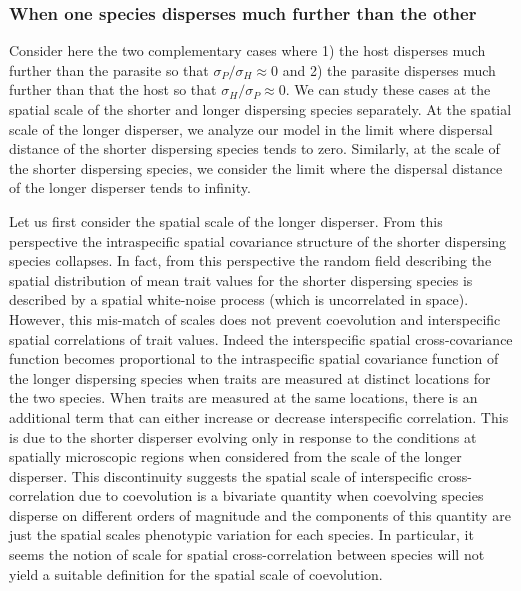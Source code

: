 \documentclass{article}
\begin{document}
\hypertarget{when-one-species-disperses-much-further-than-the-other}{%
\subsubsection{When one species disperses much further than the
other}\label{when-one-species-disperses-much-further-than-the-other}}

Consider here the two complementary cases where 1) the host disperses
much further than the parasite so that \(\sigma_P/\sigma_H\approx0\) and
2) the parasite disperses much further than that the host so that
\(\sigma_H/\sigma_P\approx0\). We can study these cases at the spatial
scale of the shorter and longer dispersing species separately. At the
spatial scale of the longer disperser, we analyze our model in the limit
where dispersal distance of the shorter dispersing species tends to
zero. Similarly, at the scale of the shorter dispersing species, we
consider the limit where the dispersal distance of the longer disperser
tends to infinity.

Let us first consider the spatial scale of the longer disperser. From
this perspective the intraspecific spatial covariance structure of the
shorter dispersing species collapses. In fact, from this perspective the
random field describing the spatial distribution of mean trait values
for the shorter dispersing species is described by a spatial white-noise
process (which is uncorrelated in space). However, this mis-match of
scales does not prevent coevolution and interspecific spatial
correlations of trait values. Indeed the interspecific spatial
cross-covariance function becomes proportional to the intraspecific
spatial covariance function of the longer dispersing species when traits
are measured at distinct locations for the two species. When traits are
measured at the same locations, there is an additional term that can
either increase or decrease interspecific correlation. This is due to
the shorter disperser evolving only in response to the conditions at
spatially microscopic regions when considered from the scale of the
longer disperser. This discontinuity suggests the spatial scale of
interspecific cross-correlation due to coevolution is a bivariate
quantity when coevolving species disperse on different orders of
magnitude and the components of this quantity are just the spatial
scales phenotypic variation for each species. In particular, it seems
the notion of scale for spatial cross-correlation between species will
not yield a suitable definition for the spatial scale of coevolution.
\end{document}

